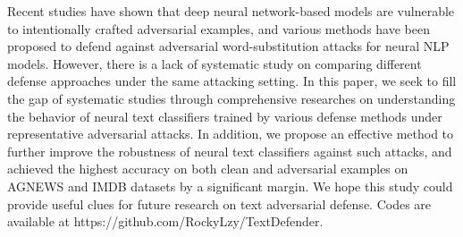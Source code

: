 Recent studies have shown that deep neural network-based models are vulnerable to intentionally crafted adversarial examples, and various methods have been proposed to defend against adversarial word-substitution attacks for neural NLP models. However, there is a lack of systematic study on comparing different defense approaches under the same attacking setting. In this paper, we seek to fill the gap of systematic studies through comprehensive researches on understanding the behavior of neural text classifiers trained by various defense methods under representative adversarial attacks. In addition, we propose an effective method to further improve the robustness of neural text classifiers against such attacks, and achieved the highest accuracy on both clean and adversarial examples on AGNEWS and IMDB datasets by a significant margin. We hope this study could provide useful clues for future research on text adversarial defense. Codes are available at https://github.com/RockyLzy/TextDefender.
